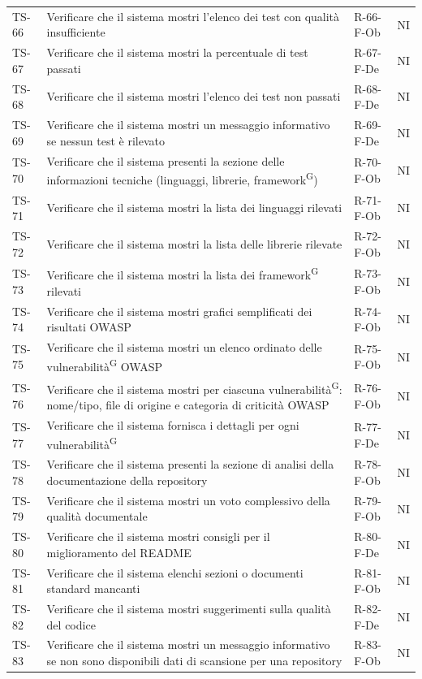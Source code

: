 \documentclass[a4paper, 11pt]{article}
\begin{document}
\begin{longtable}{>{\centering\arraybackslash}m{1.2cm} >{\raggedright\arraybackslash}p{8.2cm} >{\centering\arraybackslash}m{2.5cm} >{\centering\arraybackslash}m{1.2cm}}
TS-66 & Verificare che il sistema mostri l'elenco dei test con qualità insufficiente & R-66-F-Ob & NI \\
TS-67 & Verificare che il sistema mostri la percentuale di test passati & R-67-F-De & NI \\
TS-68 & Verificare che il sistema mostri l'elenco dei test non passati & R-68-F-De & NI \\
TS-69 & Verificare che il sistema mostri un messaggio informativo se nessun test è rilevato & R-69-F-De & NI \\
TS-70 & Verificare che il sistema presenti la sezione delle informazioni tecniche (linguaggi, librerie, framework\textsuperscript{G}) & R-70-F-Ob & NI \\
TS-71 & Verificare che il sistema mostri la lista dei linguaggi rilevati & R-71-F-Ob & NI \\
TS-72 & Verificare che il sistema mostri la lista delle librerie rilevate & R-72-F-Ob & NI \\
TS-73 & Verificare che il sistema mostri la lista dei framework\textsuperscript{G} rilevati & R-73-F-Ob & NI \\
TS-74 & Verificare che il sistema mostri grafici semplificati dei risultati OWASP & R-74-F-Ob & NI \\
TS-75 & Verificare che il sistema mostri un elenco ordinato delle vulnerabilità\textsuperscript{G} OWASP & R-75-F-Ob & NI \\
TS-76 & Verificare che il sistema mostri per ciascuna vulnerabilità\textsuperscript{G}: nome/tipo, file di origine e categoria di criticità OWASP & R-76-F-Ob & NI \\
TS-77 & Verificare che il sistema fornisca i dettagli per ogni vulnerabilità\textsuperscript{G} & R-77-F-De & NI \\
TS-78 & Verificare che il sistema presenti la sezione di analisi della documentazione della repository & R-78-F-Ob & NI \\
TS-79 & Verificare che il sistema mostri un voto complessivo della qualità documentale & R-79-F-Ob & NI \\
TS-80 & Verificare che il sistema mostri consigli per il miglioramento del README & R-80-F-De & NI \\
TS-81 & Verificare che il sistema elenchi sezioni o documenti standard mancanti & R-81-F-Ob & NI \\
TS-82 & Verificare che il sistema mostri suggerimenti sulla qualità del codice & R-82-F-De & NI \\
TS-83 & Verificare che il sistema mostri un messaggio informativo se non sono disponibili dati di scansione per una repository & R-83-F-Ob & NI \\

\end{longtable}
\end{document}

